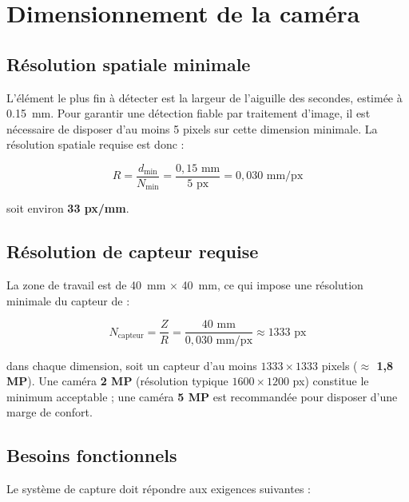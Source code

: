 \section{Dimensionnement de la caméra}

\subsection{Résolution spatiale minimale}

L'élément le plus fin à détecter est la largeur de l'aiguille des secondes, estimée à \SI{0.15}{mm}.
Pour garantir une détection fiable par traitement d'image, il est nécessaire de disposer d'au
moins 5 pixels sur cette dimension minimale. La résolution spatiale requise est donc :

\[
R = \frac{d_{\min}}{N_{\min}} = \frac{0{,}15 \text{ mm}}{5 \text{ px}} = 0{,}030 \text{ mm/px}
\]

soit environ \textbf{33 px/mm}.

\subsection{Résolution de capteur requise}

La zone de travail est de \SI{40}{mm} $\times$ \SI{40}{mm}, ce qui impose une résolution minimale
du capteur de :

\[
N_{\text{capteur}} = \frac{Z}{R} = \frac{40 \text{ mm}}{0{,}030 \text{ mm/px}} \approx 1333 \text{ px}
\]

dans chaque dimension, soit un capteur d'au moins $1333 \times 1333$ pixels (\textbf{$\approx$ 1,8 MP}).
Une caméra \textbf{2 MP} (résolution typique $1600 \times 1200$ px) constitue le minimum acceptable ;
une caméra \textbf{5 MP} est recommandée pour disposer d'une marge de confort.

\subsection{Besoins fonctionnels}

Le système de capture doit répondre aux exigences suivantes :

